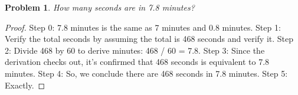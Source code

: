 \documentclass{article}
\newtheorem{theorem}{Problem}
\begin{document}
\begin{theorem}
How many seconds are in 7.8 minutes?
\end{theorem}

\begin{proof}
Step 0: 7.8 minutes is the same as 7 minutes and 0.8 minutes.
Step 1: Verify the total seconds by assuming the total is 468 seconds and verify it.
Step 2: Divide 468 by 60 to derive minutes: 468 / 60 = 7.8.
Step 3: Since the derivation checks out, it’s confirmed that 468 seconds is equivalent to 7.8 minutes.
Step 4: So, we conclude there are 468 seconds in 7.8 minutes.
Step 5: Exactly.
\end{proof}
\end{document}
